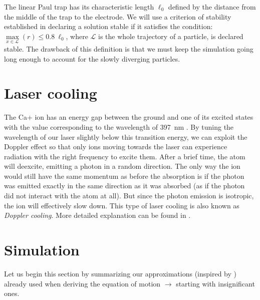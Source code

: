 The linear Paul trap has its characteristic length $\ell_0$ defined by the distance from the middle of the trap to the electrode. We will use a criterion of stability established in \cite{gerlich1992inhomogeneous} declaring a solution stable if it satisfies the condition: \\ $\max\limits_{x \in \mathcal{L}}(r) \leq 0.8 \ \ell_0$, where $\mathcal{L}$ is the whole trajectory of a particle, is declared stable. The drawback of this definition is that we must keep the simulation going long enough to account for the slowly diverging particles.

\section{Laser cooling} 

The Ca+ ion has an energy gap between the ground and one of its excited states with the value corresponding to the wavelength of \SI{397}{\nano\meter} \cite{urabe1993laser}. By tuning the wavelength of our laser slightly below this transition energy, we can exploit the Doppler effect so that only ions moving towards the laser can experience radiation with the right frequency to excite them. After a brief time, the atom will deexcite, emitting a photon in a random direction. The only way the ion would still have the same momentum as before the absorption is if the photon was emitted exactly in the same direction  as it was absorbed (as if the photon did not interact with the atom at all). But since the photon emission is isotropic, the ion will effectively slow down. This type of laser cooling is also known as \emph{Doppler cooling}. More detailed explanation can be found in \cite{alma990008711500106986}.  
 
	
\section{Simulation}
\label{simulation}

Let us begin this section by summarizing our approximations (inspired by \cite{Friedman_1982}) already used when deriving the equation of motion $\rightarrow$ starting with insignificant ones. 

